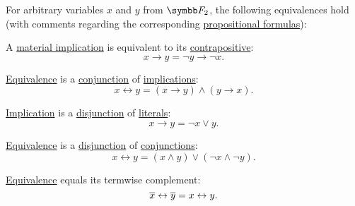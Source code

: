 \begin{proposition}\label{thm:boolean_function_equivalences}
  For arbitrary variables \( x \) and \( y \) from \( \BF_2 \), the following equivalences hold (with comments regarding the corresponding \hyperref[def:propositional_language/formula]{propositional formulas}):

  \begin{PropEnum}
     A \hyperref[def:material_implication]{material implication} is equivalent to its \hyperref[def:material_implication/contrapositive]{contrapositive}:
    \begin{equation}\label{eq:thm:boolean_equivalences/contrapositive}
      x \rightarrow y = \neg y \rightarrow \neg x.
    \end{equation}

     \hyperref[def:propositional_alphabet/connectives/equivalence]{Equivalence} is a \hyperref[def:propositional_alphabet/connectives/conjunction]{conjunction} of \hyperref[def:material_implication]{implications}:
    \begin{equation}\label{eq:thm:boolean_equivalences/equivalence_via_implication}
      x \leftrightarrow y = (x \rightarrow y) \wedge (y \rightarrow x).
    \end{equation}

     \hyperref[def:propositional_alphabet/connectives/implication]{Implication} is a \hyperref[def:propositional_alphabet/connectives/disjunction]{disjunction} of \hyperref[def:conjunctive_disjunctive_normal_form/literal]{literals}:
    \begin{equation}\label{eq:thm:boolean_equivalences/equivalence_cnf}
      x \rightarrow y = \neg x \vee y.
    \end{equation}

     \hyperref[def:propositional_alphabet/connectives/equivalence]{Equivalence} is a \hyperref[def:propositional_alphabet/connectives/disjunction]{disjunction} of \hyperref[def:propositional_alphabet/connectives/conjunction]{conjunctions}:
    \begin{equation}\label{eq:thm:boolean_equivalences/equivalence_dnf}
      x \leftrightarrow y = (x \wedge y) \vee (\neg x \wedge \neg y).
    \end{equation}

     \hyperref[def:propositional_alphabet/connectives/equivalence]{Equivalence} equals its termwise complement:
    \begin{equation}\label{eq:thm:boolean_equivalences/equivalence_complement}
      \overline{x} \leftrightarrow \overline{y} = x \leftrightarrow y.
    \end{equation}


\end{PropEnum}
\end{proposition}
